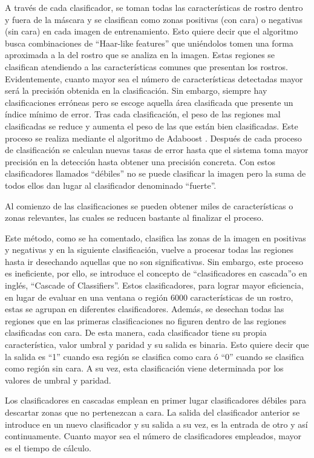 A través de cada clasificador, se toman todas las características de rostro dentro y fuera de la máscara y se clasifican como zonas positivas (con cara) o negativas (sin cara) en cada imagen de entrenamiento. Esto quiere decir que el algoritmo busca combinaciones de ``Haar-like features'' \citep{opencvhaar} que uniéndolos tomen una forma aproximada a la del rostro que se analiza en la imagen. Estas regiones se clasifican atendiendo a las características comunes que presentan los rostros. Evidentemente, cuanto mayor sea el número de características detectadas mayor será la precisión obtenida en la clasificación. Sin embargo, siempre hay clasificaciones erróneas pero se escoge aquella área clasificada que presente un índice mínimo de error. Tras cada clasificación, el peso de las regiones mal clasificadas se reduce y aumenta el peso de las que están bien clasificadas. Este proceso se realiza mediante el algoritmo de Adaboost \citep{opencvorg}. Después de cada proceso de clasificación se calculan nuevas tasas de error hasta que el sistema toma mayor precisión en la detección hasta obtener una precisión concreta. Con estos clasificadores llamados ``débiles'' no se puede clasificar la imagen pero la suma de todos ellos dan lugar al clasificador denominado ``fuerte''. 

Al comienzo de las clasificaciones se pueden obtener miles de características o zonas relevantes, las cuales se reducen bastante al finalizar el proceso.

Este método, como se ha comentado, clasifica las zonas de la imagen en positivas y negativas y en la siguiente clasificación, vuelve a procesar todas las regiones hasta ir desechando aquellas que no son significativas. Sin embargo, este proceso es ineficiente, por ello, se introduce el concepto de ``clasificadores en cascada''o en inglés, ``Cascade of Classifiers''. Estos clasificadores, para lograr mayor eficiencia, en lugar de evaluar en una ventana o región 6000 características de un rostro, estas se agrupan en diferentes clasificadores. Además, se desechan todas las regiones que en las primeras clasificaciones no figuren dentro de las regiones clasificadas con cara. De esta manera, cada clasificador tiene su propia característica, valor umbral y paridad y su salida es binaria. Esto quiere decir que la salida es ``1'' cuando esa región se clasifica como cara ó ``0'' cuando se clasifica como región sin cara. A su vez, esta clasificación viene determinada por los valores de umbral y paridad.

Los clasificadores en cascadas emplean en primer lugar clasificadores débiles para descartar zonas que no pertenezcan a cara. La salida del clasificador anterior se introduce en un nuevo clasificador y su salida a su vez, es la entrada de otro y así continuamente. Cuanto mayor sea el número de clasificadores empleados, mayor es el tiempo de cálculo.


